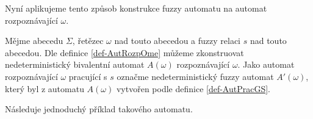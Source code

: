 \documentclass[a4paper,10pt]{article}
\begin{document}
Nyní aplikujeme tento způsob konstrukce fuzzy automatu na automat rozpoznávající $\omega$.

\begin{definition}
 Mějme abecedu $\Sigma$, řetězec $\omega$ nad touto abecedou a fuzzy relaci $s$ nad touto abecedou. Dle definice \ref{def-AutRozpOme} můžeme zkonstruovat nedeterministický bivalentní automat $A(\omega)$ rozpoznávající $\omega$. Jako automat rozpoznávající $\omega$ pracující s $s$ označme nedeterministický fuzzy automat $A'(\omega)$, který byl z automatu $A(\omega)$ vytvořen podle definice \ref{def-AutPracGS}.
\end{definition}


Následuje jednoduchý příklad takového automatu.
\end{document}

